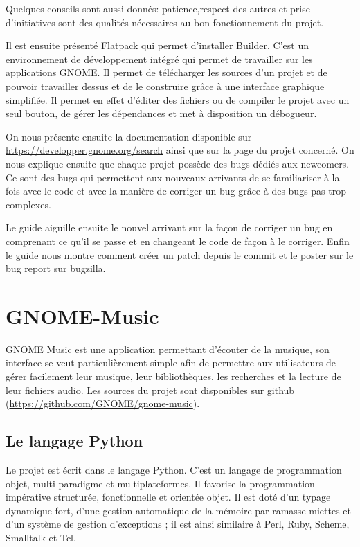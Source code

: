 \documentclass[12pt]{report}
\begin{document}
Quelques conseils sont aussi donnés: patience,respect des autres et prise
d'initiatives sont des qualités nécessaires au bon fonctionnement du projet.

Il est ensuite présenté Flatpack qui permet d'installer Builder.
C'est un environnement de développement intégré qui permet de travailler
sur les applications GNOME. Il permet de télécharger les sources d'un
projet et de pouvoir travailler dessus et de le construire grâce à une
interface graphique simplifiée. Il permet en effet d'éditer des fichiers
ou de compiler le projet avec un seul bouton, de gérer les dépendances
et met à disposition un débogueur.

On nous présente ensuite la documentation disponible sur
\url{https://developper.gnome.org/search}
ainsi que sur la page du projet concerné. On nous explique ensuite que
chaque projet possède des bugs dédiés aux newcomers. Ce sont des bugs
qui permettent aux nouveaux arrivants de se familiariser à la fois avec
le code et avec la manière de corriger un bug grâce à des bugs pas trop
complexes.

Le guide aiguille ensuite le nouvel arrivant sur la façon de corriger
un bug en comprenant ce qu'il se passe et en changeant le code de
façon à le corriger. Enfin le guide nous montre comment créer un
patch depuis le commit et le poster sur le bug report sur bugzilla.

\newpage
\chapter{GNOME-Music}
GNOME Music est une application permettant d'écouter de la musique, 
son interface se veut particulièrement simple afin de permettre aux
utilisateurs de gérer facilement leur musique, leur bibliothèques, 
les recherches et la lecture de leur fichiers audio.
Les sources du projet sont disponibles sur github 
(\url{https://github.com/GNOME/gnome-music}).

\section{Le langage Python}
Le projet est écrit dans le langage Python. C'est un langage de
programmation objet, multi-paradigme et multiplateformes. Il favorise la
programmation impérative structurée, fonctionnelle et orientée objet. 
Il est doté d'un typage dynamique fort, d'une gestion automatique de la 
mémoire par ramasse-miettes et d'un système de gestion d'exceptions ; 
il est ainsi similaire à Perl, Ruby, Scheme, Smalltalk et Tcl.
\end{document}
